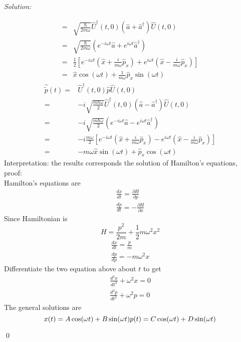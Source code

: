 \documentclass[12pt,a4paper]{article}
\newenvironment{sol}
    {\emph{Solution:}
    }
    {
    \qed
    }
\begin{document}
\begin{sol}
\begin{itemize}
\begin{align}
\nonumber=&\sqrt{\frac{\hbar}{2m\omega}}\hat{U}^{\dagger}(t,0)(\hat{a}+\hat{a}^{\dagger})\hat{U}(t,0)\\
\nonumber=&\sqrt{\frac{\hbar}{2m\omega}}(e^{-i\omega t}\hat{a}+e^{i\omega t}\hat{a}^{\dagger})\\
\nonumber=&\frac{1}{2}\left[e^{-i\omega t}\left(\hat{x}+\frac{i}{m\omega}\hat{p}_x\right)+e^{i\omega t}(\hat{x}-\frac{i}{m\omega}\hat{p}_x)\right]\\
=&\hat{x}\cos(\omega t)+\frac{1}{m\omega}\hat{p}_x\sin(\omega t)
\end{align}
\begin{align}
\nonumber\hat{\tilde{p}}(t)=&\hat{U}^{\dagger}(t,0)\hat{p}\hat{U}(t,0)\\
\nonumber=&-i\sqrt{\frac{m\hbar\omega}{2}}\hat{U}^{\dagger}(t,0)(\hat{a}-\hat{a}^{\dagger})\hat{U}(t,0)\\
\nonumber=&-i\sqrt{\frac{m\hbar\omega}{2}}(e^{-i\omega t}\hat{a}-e^{i\omega t}\hat{a}^{\dagger})\\
\nonumber=&-i\frac{m\omega}{2}\left[e^{-i\omega t}\left(\hat{x}+\frac{i}{m\omega}\hat{p}_x\right)-e^{i\omega t}(\hat{x}-\frac{i}{m\omega}\hat{p}_x)\right]\\
=&-m\omega\hat{x}\sin(\omega t)+\hat{p}_x\cos(\omega t)
\end{align}
Interpretation: the results corresponds the solution of Hamilton's equations, proof:\\
Hamilton's equations are
\begin{gather}
\frac{dx}{dt}=\frac{\partial H}{\partial p}\\
\frac{dp}{dt}=-\frac{\partial H}{\partial x}
\end{gather}
Since Hamiltonian is
\begin{equation}
H=\frac{p^2}{2m}+\frac{1}{2}m\omega^2x^2
\end{equation}
\begin{gather}
\frac{dx}{dt}=\frac{p}{m}\\
\frac{dp}{dp}=-m\omega^2x
\end{gather}
Differentiate the two equation above about $t$ to get
\begin{gather}
\frac{d^2x}{dt^2}+\omega^2x=0\\
\frac{d^2p}{dt^2}+\omega^2p=0
\end{gather}
The general solutions are
\begin{equation}
x(t)=A\cos(\omega t)+B\sin(\omega t)\\
p(t)=C\cos(\omega t)+D\sin(\omega t)
\end{equation}

\end{itemize}
\end{sol}
\end{document}
